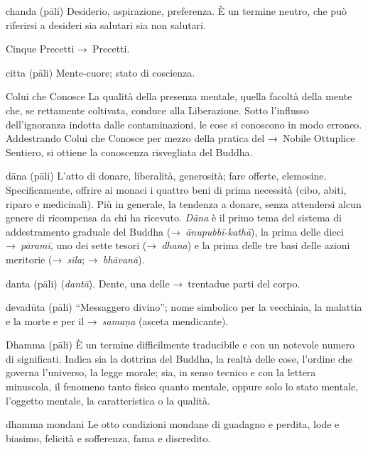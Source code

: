 \begin{glossarydescription}
\item[chanda] (pāli) Desiderio, aspirazione, preferenza. È un termine neutro,
  che può riferirsi a desideri sia salutari sia non salutari.

\item[Cinque Precetti] →~Precetti.

\item[citta] (pāli) Mente-cuore; stato di coscienza.

\item[Colui che Conosce] La qualità della presenza mentale, quella facoltà della
  mente che, se rettamente coltivata, conduce alla Liberazione. Sotto l'influsso
  dell'ignoranza indotta dalle contaminazioni, le cose si conoscono in modo
  erroneo. Addestrando Colui che Conosce per mezzo della pratica del →~Nobile
  Ottuplice Sentiero, si ottiene la conoscenza risvegliata del Buddha.


\item[dāna] (pāli) L'atto di donare, liberalità, generosità; fare offerte,
  elemosine. Specificamente, offrire ai monaci i quattro beni di prima necessità
  (cibo, abiti, riparo e medicinali). Più in generale, la tendenza a donare,
  senza attendersi alcun genere di ricompensa da chi ha ricevuto. \emph{Dāna} è
  il primo tema del sistema di addestramento graduale del Buddha
  (→~\emph{ānupubbī-kathā}), la prima delle dieci →~\emph{pāramī}, uno dei sette
  tesori (→~\emph{dhana}) e la prima delle tre basi delle azioni meritorie
  (→~\emph{sīla}; →~\emph{bhāvanā}).

\item[danta] (pāli) (\emph{dantā}). Dente, una delle →~trentadue parti del
  corpo.

\item[devadūta] (pāli) ``Messaggero divino''; nome simbolico per la vecchiaia,
  la malattia e la morte e per il →~\emph{samaṇa} (asceta mendicante).

\item[Dhamma] (pāli)\label{glossary-dhamma} È un termine difficilmente traducibile e con un notevole
  numero di significati. Indica sia la dottrina del Buddha, la realtà delle
  cose, l'ordine che governa l'universo, la legge morale; sia, in senso tecnico
  e con la lettera minuscola, il fenomeno tanto fisico quanto mentale, oppure
  solo lo stato mentale, l'oggetto mentale, la caratteristica o la qualità.

\item[dhamma mondani] Le otto condizioni mondane di guadagno e perdita, lode e
  biasimo, felicità e sofferenza, fama e discredito.


\end{glossarydescription}

